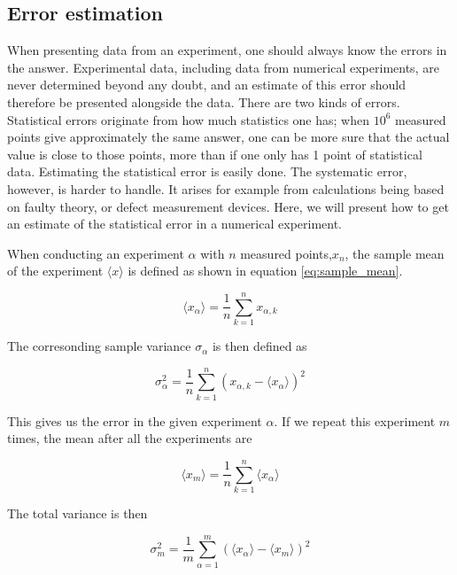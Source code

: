 \documentclass[norsk,a4paper,12pt]{article}
\begin{document}
\subsection{Error estimation} \label{Error_estimation}
When presenting data from an experiment, one should always know the errors in the answer. Experimental data, including data from numerical experiments, are never determined beyond any doubt, and an estimate of this error should therefore be presented alongside the data. 
There are two kinds of errors. Statistical errors originate from how much statistics one has; when $10^6$ measured points give approximately the same answer, one can be more sure that the actual value is close to those points, more than if one only has 1 point of statistical data. Estimating the statistical error is easily done. The systematic error, however, is harder to handle. It arises for example from calculations being based on faulty theory, or defect measurement devices. Here, we will present how to get an estimate of the statistical error in a numerical experiment.
\par 
\vspace{3mm}
When conducting an experiment $\alpha$ with $n$ measured points,$x_n$, the sample mean of the experiment $\langle x \rangle$ is defined as shown in equation \ref{eq:sample_mean}.

\begin{equation}
\label{eq:sample_mean}
\langle x_{\alpha} \rangle = \frac{1}{n} \sum_{k=1}^n x_{\alpha,k}
\end{equation}

The corresonding sample variance $\sigma_{\alpha}$ is then defined as

\begin{equation}
\sigma_{\alpha}^2 = \frac{1}{n} \sum_{k=1}^n (x_{\alpha,k} - \langle x_{\alpha} \rangle )^2
\end{equation}

This gives us the error in the given experiment $\alpha$. If we repeat this experiment $m$ times, the mean after all the experiments are

\begin{equation}
\label{eq:mean}
\langle x_{m} \rangle = \frac{1}{n} \sum_{k=1}^n  \langle x_{\alpha} \rangle
\end{equation}

The total variance is then

\begin{equation}
\sigma_m^2 = \frac{1}{m} \sum_{\alpha=1}^m ( \langle x_{\alpha} \rangle - \langle x_{m} \rangle )^2
\end{equation}
\end{document}
